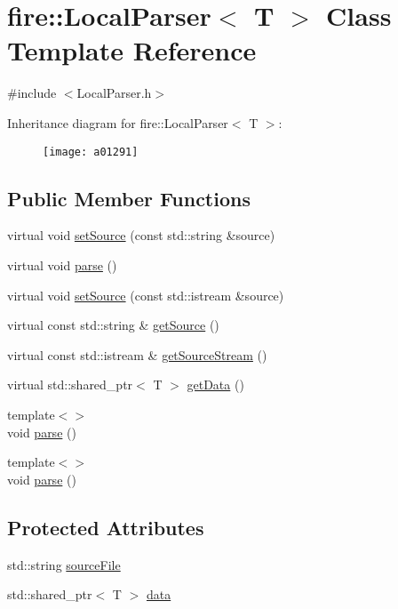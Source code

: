 \hypertarget{a01291}{}\section{fire\+:\+:Local\+Parser$<$ T $>$ Class Template Reference}
\label{a01291}


{\ttfamily \#include $<$Local\+Parser.\+h$>$}

Inheritance diagram for fire\+:\+:Local\+Parser$<$ T $>$\+:\begin{figure}[H]
\begin{center}
\leavevmode
\texttt{[image: a01291]}
\end{center}
\end{figure}
\subsection*{Public Member Functions}
\begin{DoxyCompactItemize}
\item 
virtual void \hyperlink{a01291_afcaec6429fdd6e5d53642a32c001ff73}{set\+Source} (const std\+::string \&source)
\item 
virtual void \hyperlink{a01291_abd8929aea06c2dda40256d2e58236650}{parse} ()
\item 
virtual void \hyperlink{a01291_aed4357541f2ff7d46f8846bd07bb3c42}{set\+Source} (const std\+::istream \&source)
\item 
virtual const std\+::string \& \hyperlink{a01291_aedb7fe10911182525a719963b9b56726}{get\+Source} ()
\item 
virtual const std\+::istream \& \hyperlink{a01291_a9bf19a3cc9ae8ac0e6e7a0e7f6212cdc}{get\+Source\+Stream} ()
\item 
virtual std\+::shared\+\_\+ptr$<$ T $>$ \hyperlink{a01291_ab9016cca8e5dca516bb57c6a8e76607a}{get\+Data} ()
\item 
{\footnotesize template$<$$>$ }\\void \hyperlink{a01291_a34fd9ffb0196c612c75b5288ed5e219b}{parse} ()
\item 
{\footnotesize template$<$$>$ }\\void \hyperlink{a01291_ae904e264fe16708b3e434adea59e1b88}{parse} ()
\end{DoxyCompactItemize}
\subsection*{Protected Attributes}
\begin{DoxyCompactItemize}
\item 
std\+::string \hyperlink{a01291_acf921ee916266efe70be5b24bec37fce}{source\+File}
\item 
std\+::shared\+\_\+ptr$<$ T $>$ \hyperlink{a01291_af8f722c7e35378c69e76e4275d384d86}{data}
\end{DoxyCompactItemize}


